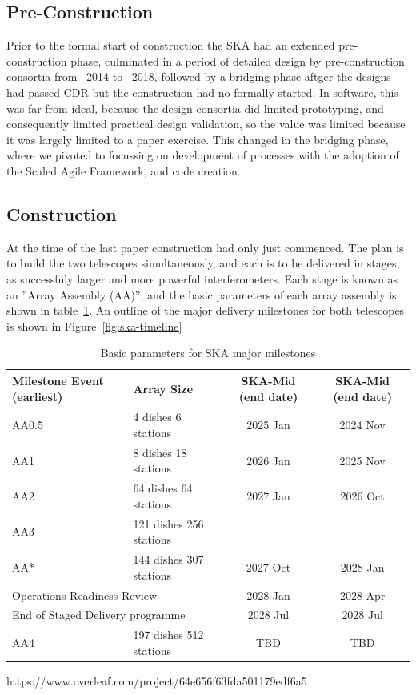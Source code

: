 \documentclass[a4paper,
               biblatex,     %
               keeplastbox,   %
               ]{jacow}
\begin{document}
\subsection{Pre-Construction}
Prior to the formal start of construction the SKA had an extended pre-construction phase, culminated in a period of detailed design by pre-construction consortia from ~2014 to ~2018, followed by a bridging phase aftger the designs had passed CDR but the construction had no formally started. In software, this was far from ideal, because the design consortia did limited prototyping, and consequently limited practical design validation, so the value was limited because it was largely limited to a paper exercise. This changed in the bridging phase, where we pivoted to focussing on development of processes with the adoption of the Scaled Agile Framework, and code creation.

\subsection{Construction}
At the time of the last paper construction had only just commenced. The plan is to build the two telescopes simultaneously, and each is to be delivered in stages, as successfuly larger and more powerful interferometers. Each stage is known as an ''Array Assembly (AA)'', and the basic parameters of each array assembly is shown in table~\ref{tab:array-assemblies}. An outline of the major delivery milestones for both telescopes is shown in Figure~\ref{fig:ska-timeline}

\begin{table}[!h]
	\centering
	\caption{Basic parameters for SKA major milestones}
        \begin{tabular}{llcc}
            \toprule
            Milestone Event (earliest) & Array Size & SKA-Mid (end date) & SKA-Mid (end date)\\
            \midrule
            AA0.5 & 4 dishes 6 stations   & 2025 Jan & 2024 Nov\\
            AA1   & 8 dishes 18 stations  & 2026 Jan & 2025 Nov\\
            AA2   & 64 dishes 64 stations & 2027 Jan & 2026 Oct\\
            AA3 & 121 dishes 256 stations &  & \\
            AA* & 144 dishes 307 stations & 2027 Oct & 2028 Jan\\
            \multicolumn{2}{l}{Operations Readiness Review} & 2028 Jan & 2028 Apr\\
            \multicolumn{2}{l}{End of Staged Delivery programme} & 2028 Jul & 2028 Jul\\
            AA4 & 197 dishes 512 stations & TBD & TBD\\
            \bottomrule
        \end{tabular}https://www.overleaf.com/project/64e656f63fda501179edf6a5
	\label{tab:array-assemblies}
 \end{table}
\end{document}
